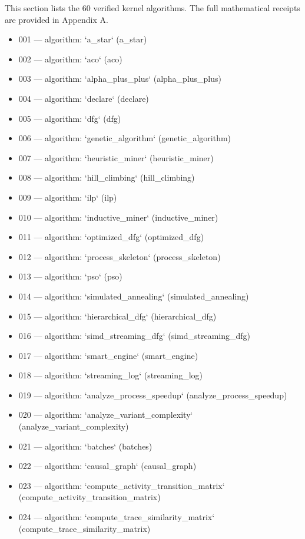 This section lists the 60 verified kernel algorithms. The full mathematical receipts are provided in Appendix A.

\begin{itemize}
  \item 001 — algorithm: `a\_star` (a\_star)
  \item 002 — algorithm: `aco` (aco)
  \item 003 — algorithm: `alpha\_plus\_plus` (alpha\_plus\_plus)
  \item 004 — algorithm: `declare` (declare)
  \item 005 — algorithm: `dfg` (dfg)
  \item 006 — algorithm: `genetic\_algorithm` (genetic\_algorithm)
  \item 007 — algorithm: `heuristic\_miner` (heuristic\_miner)
  \item 008 — algorithm: `hill\_climbing` (hill\_climbing)
  \item 009 — algorithm: `ilp` (ilp)
  \item 010 — algorithm: `inductive\_miner` (inductive\_miner)
  \item 011 — algorithm: `optimized\_dfg` (optimized\_dfg)
  \item 012 — algorithm: `process\_skeleton` (process\_skeleton)
  \item 013 — algorithm: `pso` (pso)
  \item 014 — algorithm: `simulated\_annealing` (simulated\_annealing)
  \item 015 — algorithm: `hierarchical\_dfg` (hierarchical\_dfg)
  \item 016 — algorithm: `simd\_streaming\_dfg` (simd\_streaming\_dfg)
  \item 017 — algorithm: `smart\_engine` (smart\_engine)
  \item 018 — algorithm: `streaming\_log` (streaming\_log)
  \item 019 — algorithm: `analyze\_process\_speedup` (analyze\_process\_speedup)
  \item 020 — algorithm: `analyze\_variant\_complexity` (analyze\_variant\_complexity)
  \item 021 — algorithm: `batches` (batches)
  \item 022 — algorithm: `causal\_graph` (causal\_graph)
  \item 023 — algorithm: `compute\_activity\_transition\_matrix` (compute\_activity\_transition\_matrix)
  \item 024 — algorithm: `compute\_trace\_similarity\_matrix` (compute\_trace\_similarity\_matrix)

\end{itemize}
